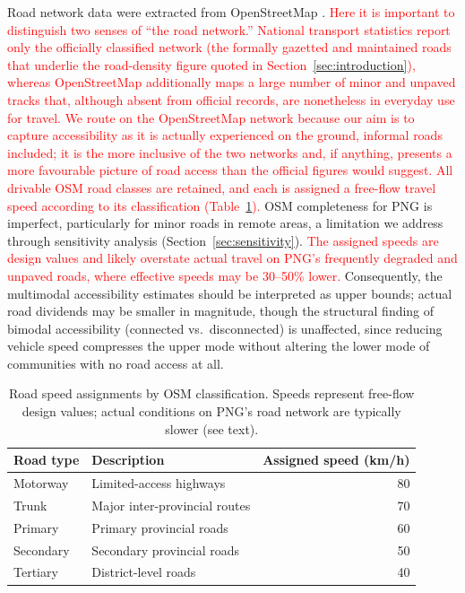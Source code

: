 \documentclass[review,3p,authoryear]{elsarticle}
\newcommand{\rev}[1]{\textcolor{red}{#1}}
\begin{document}
Road network data were extracted from OpenStreetMap \citep{barrington2017, haklay2010}. \rev{Here it is important to distinguish two senses of ``the road network.'' National transport statistics report only the officially classified network (the formally gazetted and maintained roads that underlie the road-density figure quoted in Section~\ref{sec:introduction}), whereas OpenStreetMap additionally maps a large number of minor and unpaved tracks that, although absent from official records, are nonetheless in everyday use for travel. We route on the OpenStreetMap network because our aim is to capture accessibility as it is actually experienced on the ground, informal roads included; it is the more inclusive of the two networks and, if anything, presents a more favourable picture of road access than the official figures would suggest. All drivable OSM road classes are retained, and each is assigned a free-flow travel speed according to its classification (Table~\ref{tab:speeds}).} OSM completeness for PNG is imperfect, particularly for minor roads in remote areas, a limitation we address through sensitivity analysis (Section~\ref{sec:sensitivity}). \rev{The assigned speeds are design values and likely overstate actual travel on PNG's frequently degraded and unpaved roads, where effective speeds may be 30--50\% lower.} Consequently, the multimodal accessibility estimates should be interpreted as upper bounds; actual road dividends may be smaller in magnitude, though the structural finding of bimodal accessibility (connected vs.\ disconnected) is unaffected, since reducing vehicle speed compresses the upper mode without altering the lower mode of communities with no road access at all.

\begin{table}[!h]
\centering
\caption{Road speed assignments by OSM classification. Speeds represent free-flow design values; actual conditions on PNG's road network are typically slower (see text).}
\label{tab:speeds}
\begin{tabular}{@{}llr@{}}
\toprule
Road type & Description & Assigned speed (\si{\kilo\metre/\hour}) \\
\midrule
Motorway  & Limited-access highways       & 80 \\
Trunk     & Major inter-provincial routes & 70 \\
Primary   & Primary provincial roads      & 60 \\
Secondary & Secondary provincial roads    & 50 \\
Tertiary  & District-level roads          & 40 \\
\bottomrule
\end{tabular}
\end{table}
\end{document}
